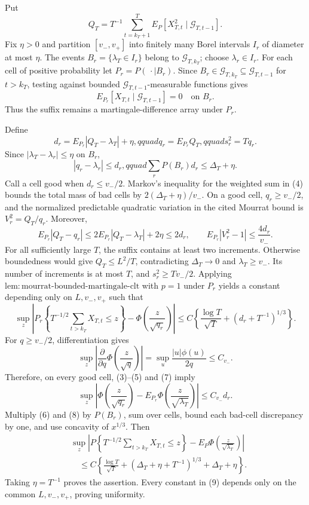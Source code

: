 Put
\[
 Q_T=T^{-1}\sum_{t=k_T+1}^T
 E_P[X_{T,t}^2\mid\mathcal G_{T,t-1}].
\tag{1}
\]
Fix \(\eta>0\) and partition \([v_-,v_+]\) into finitely many Borel intervals \(I_r\) of diameter at most \(\eta\).  The events \(B_r=\{\lambda_T\in I_r\}\) belong to \(\mathcal G_{T,k_T}\); choose \(\lambda_r\in I_r\).  For each cell of positive probability let \(P_r=P(\,\cdot\mid B_r)\).  Since \(B_r\in\mathcal G_{T,k_T}\subseteq\mathcal G_{T,t-1}\) for \(t>k_T\), testing against bounded \(\mathcal G_{T,t-1}\)-measurable functions gives
\[
 E_{P_r}[X_{T,t}\mid\mathcal G_{T,t-1}]=0
 \quad\text{on }B_r.
\tag{2}
\]
Thus the suffix remains a martingale-difference array under \(P_r\).

Define
\[
 d_r=E_{P_r}|Q_T-\lambda_T|+\eta,qquad
 q_r=E_{P_r}Q_T,qquad s_r^2=Tq_r.
\tag{3}
\]
Since \(|\lambda_T-\lambda_r|\le\eta\) on \(B_r\),
\[
 |q_r-\lambda_r|\le d_r,qquad
 \sum_rP(B_r)d_r\le\Delta_T+\eta.
\tag{4}
\]
Call a cell good when \(d_r\le v_-/2\).  Markov's inequality for the weighted sum in (4) bounds the total mass of bad cells by \(2(\Delta_T+\eta)/v_-\).  On a good cell, \(q_r\ge v_-/2\), and the normalized predictable quadratic variation in the cited Mourrat bound is \(V_r^2=Q_T/q_r\).  Moreover,
\[
 E_{P_r}|Q_T-q_r|
 \le2E_{P_r}|Q_T-\lambda_T|+2\eta\le2d_r,
 \qquad E_{P_r}|V_r^2-1|\le\frac{4d_r}{v_-}.
\tag{5}
\]
For all sufficiently large \(T\), the suffix contains at least two increments.  Otherwise boundedness would give \(Q_T\le L^2/T\), contradicting \(\Delta_T\to0\) and \(\lambda_T\ge v_-\).  Its number of increments is at most \(T\), and \(s_r^2\ge Tv_-/2\).  Applying \(\mathrm{lem:mourrat\text{-}bounded\text{-}martingale\text{-}clt}\) with \(p=1\) under \(P_r\) yields a constant depending only on \(L,v_-,v_+\) such that
\[
 \sup_z\left|P_r\!\left\{T^{-1/2}\sum_{t>k_T}X_{T,t}\le z\right\}
 -\Phi\!\left(\frac z{\sqrt{q_r}}\right)\right|
 \le C\left\{\frac{\log T}{\sqrt T}+(d_r+T^{-1})^{1/3}\right\}.
\tag{6}
\]
For \(q\ge v_-/2\), differentiation gives
\[
 \sup_z\left|\frac{\partial}{\partial q}
 \Phi\!\left(\frac z{\sqrt q}\right)\right|
 =\sup_u\frac{|u|\phi(u)}{2q}\le C_{v_-}.
\tag{7}
\]
Therefore, on every good cell, (3)--(5) and (7) imply
\[
 \sup_z\left|\Phi\!\left(\frac z{\sqrt{q_r}}\right)
 -E_{P_r}\Phi\!\left(\frac z{\sqrt{\lambda_T}}\right)\right|
 \le C_{v_-}d_r.
\tag{8}
\]
Multiply (6) and (8) by \(P(B_r)\), sum over cells, bound each bad-cell discrepancy by one, and use concavity of \(x^{1/3}\).  Then
\[
\begin{aligned}
 &\sup_z\left|P\!\left\{T^{-1/2}\sum_{t>k_T}X_{T,t}\le z\right\}
 -E_P\Phi\!\left(\frac z{\sqrt{\lambda_T}}\right)\right|\\
 &\quad\le C\left\{\frac{\log T}{\sqrt T}
 +(\Delta_T+\eta+T^{-1})^{1/3}+\Delta_T+\eta\right\}.
\end{aligned}
\tag{9}
\]
Taking \(\eta=T^{-1}\) proves the assertion.  Every constant in (9) depends only on the common \(L,v_-,v_+\), proving uniformity.